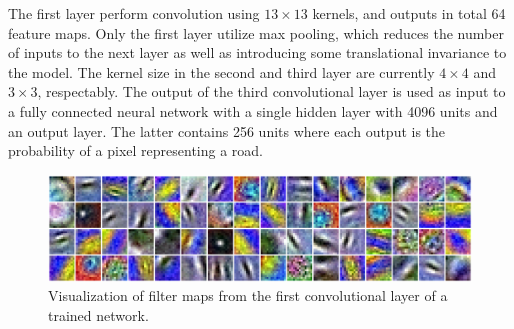 The first layer perform convolution using $13 \times 13$ kernels, and outputs in total 64 feature maps. Only the first layer utilize max pooling, which reduces the number of inputs to the next layer as well as introducing some translational invariance to the model. The kernel size in the second and third layer are currently $4 \times 4$ and $3 \times 3$, respectably. The output of the third convolutional layer is used as input to a fully connected neural network with a single hidden layer with 4096 units and an output layer. The latter contains 256 units where each output is the probability of a pixel representing a road.\\

\begin{figure}
\begin{center}
\includegraphics[width=1\columnwidth]{figs/network/Filter_unblurred.png}
\caption[Visualization of filter map]{Visualization of filter maps from the first convolutional layer of a trained network.}
\label{fig:convoluional_first_layer_visualization}
\end{center}
\end{figure}

